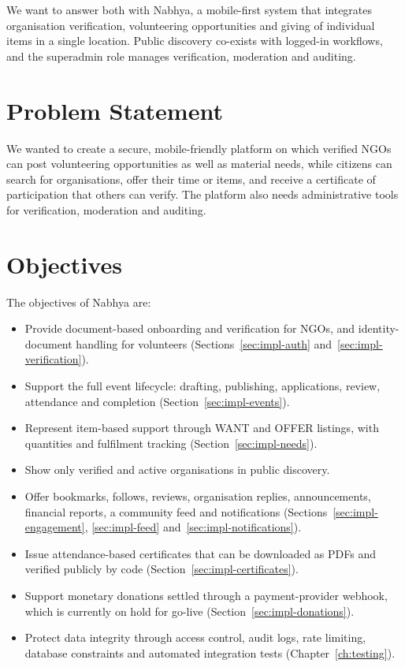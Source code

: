 We want to answer both with Nabhya, a mobile-first system that integrates organisation verification, volunteering opportunities and giving of individual items in a single location. Public discovery co-exists with logged-in workflows, and the superadmin role manages verification, moderation and auditing.

\section{Problem Statement}
We wanted to create a secure, mobile-friendly platform on which verified NGOs can post volunteering opportunities as well as material needs, while citizens can search for organisations, offer their time or items, and receive a certificate of participation that others can verify. The platform also needs administrative tools for verification, moderation and auditing.

\section{Objectives}
The objectives of Nabhya are:
\begin{itemize}
  \item Provide document-based onboarding and verification for NGOs, and identity-document handling for volunteers (Sections~\ref{sec:impl-auth} and~\ref{sec:impl-verification}).
  \item Support the full event lifecycle: drafting, publishing, applications, review, attendance and completion (Section~\ref{sec:impl-events}).
  \item Represent item-based support through WANT and OFFER listings, with quantities and fulfilment tracking (Section~\ref{sec:impl-needs}).
  \item Show only verified and active organisations in public discovery.
  \item Offer bookmarks, follows, reviews, organisation replies, announcements, financial reports, a community feed and notifications (Sections~\ref{sec:impl-engagement}, \ref{sec:impl-feed} and~\ref{sec:impl-notifications}).
  \item Issue attendance-based certificates that can be downloaded as PDFs and verified publicly by code (Section~\ref{sec:impl-certificates}).
  \item Support monetary donations settled through a payment-provider webhook, which is currently on hold for go-live (Section~\ref{sec:impl-donations}).
  \item Protect data integrity through access control, audit logs, rate limiting, database constraints and automated integration tests (Chapter~\ref{ch:testing}).
\end{itemize}

